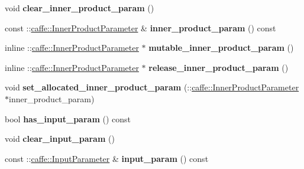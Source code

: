 \begin{DoxyCompactItemize}
void {\bfseries clear\+\_\+inner\+\_\+product\+\_\+param} ()
\item 
\mbox{\label{classcaffe_1_1_layer_parameter_a34aaae099977945398db2f06d64486ef}} 
const \+::\mbox{\hyperlink{classcaffe_1_1_inner_product_parameter}{caffe\+::\+Inner\+Product\+Parameter}} \& {\bfseries inner\+\_\+product\+\_\+param} () const
\item 
\mbox{\label{classcaffe_1_1_layer_parameter_a1fe7250cfef381c7d605f20b15dda992}} 
inline \+::\mbox{\hyperlink{classcaffe_1_1_inner_product_parameter}{caffe\+::\+Inner\+Product\+Parameter}} $\ast$ {\bfseries mutable\+\_\+inner\+\_\+product\+\_\+param} ()
\item 
\mbox{\label{classcaffe_1_1_layer_parameter_a88580b77941526b8a256a20ff29267c2}} 
inline \+::\mbox{\hyperlink{classcaffe_1_1_inner_product_parameter}{caffe\+::\+Inner\+Product\+Parameter}} $\ast$ {\bfseries release\+\_\+inner\+\_\+product\+\_\+param} ()
\item 
\mbox{\label{classcaffe_1_1_layer_parameter_a8054c3deaca85b1a269be1e074df4918}} 
void {\bfseries set\+\_\+allocated\+\_\+inner\+\_\+product\+\_\+param} (\+::\mbox{\hyperlink{classcaffe_1_1_inner_product_parameter}{caffe\+::\+Inner\+Product\+Parameter}} $\ast$inner\+\_\+product\+\_\+param)
\item 
\mbox{\label{classcaffe_1_1_layer_parameter_a3e9d7f5654f6e45a4c6228b922d06f8c}} 
bool {\bfseries has\+\_\+input\+\_\+param} () const
\item 
\mbox{\label{classcaffe_1_1_layer_parameter_a5341b8c329110e43302ca591e80c1a37}} 
void {\bfseries clear\+\_\+input\+\_\+param} ()
\item 
\mbox{\label{classcaffe_1_1_layer_parameter_a03b55eb702ab5e7e392b5267668f21e8}} 
const \+::\mbox{\hyperlink{classcaffe_1_1_input_parameter}{caffe\+::\+Input\+Parameter}} \& {\bfseries input\+\_\+param} () const
\item 
\mbox{\label{classcaffe_1_1_layer_parameter_a4bb02bae95833ce129820ec54480034b}} 

\end{DoxyCompactItemize}
